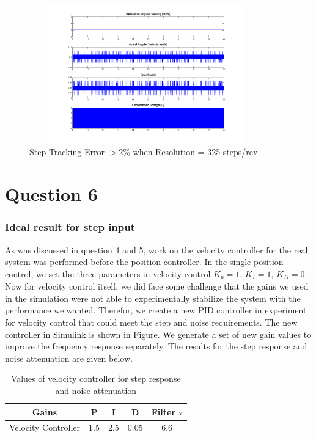 \documentclass[letterpaper]{article}
\begin{document}
\begin{figure}[H]
\begin{center}
\includegraphics[width = 10cm, height = 6cm]{q5c_step_325.png}
\caption{Step Tracking Error $> 2\%$ when Resolution = 325 steps/rev}
\label{q5_c2}
\end{center}
\end{figure}

\section*{Question 6}
\subsubsection*{Ideal result for step input}
As was discussed in question 4 and 5, work on the velocity controller for the real system was performed before the position controller. In the single position control, we set the three parameters in velocity control $K_p=1$, $K_I=1$, $K_D=0$. Now for velocity control itself, we did face some challenge that the gains we used in the simulation were not able to experimentally stabilize the system with the performance we wanted. Therefor, we create a new PID controller in experiment for velocity control that could meet the step and noise requirements. The new controller in Simulink is shown in Figure. We generate a set of new gain values to improve the frequency response separately. The results for the step response and noise attenuation are given below.\\
\begin{table}[htb]
\begin{center}
    \begin{tabular}{|c|c|c|c|c|}
    \hline
        Gains & P   & I & D     & Filter $\tau$   \\ \hline
        Velocity Controller  & 1.5 & 2.5 & 0.05 & 6.6 \\
    \hline
    \end{tabular}
\end{center}
\caption{Values of velocity controller for step response and noise attenuation}
\label{velocityGains_step_theory}
\end{table}\\
\end{document}

